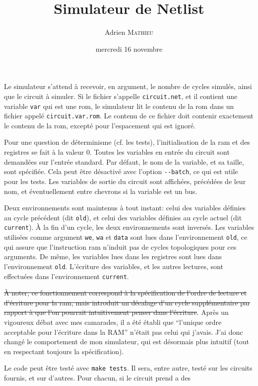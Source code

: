 \documentclass{scrartcl}
\title{Simulateur de Netlist}
\author{Adrien \textsc{Mathieu}}
\date{mercredi 16 novembre}
\begin{document}
\maketitle

Le simulateur s'attend à recevoir, en argument, le nombre de cycles simulés,
ainsi que le circuit à simuler. Si le fichier s'appelle \verb|circuit.net|, et il
contient une variable \verb|var| qui est une rom, le simulateur lit le contenu de
la rom dans un fichier appelé \verb|circuit.var.rom|. Le contenu de ce fichier
doit contenir exactement le contenu de la rom, excepté pour l'espacement qui est
ignoré.\par
Pour une question de déterminisme (cf. les tests), l'initialisation de la ram et
des registres se fait à la valeur $0$. Toutes les variables en entrée du circuit
sont demandées sur l'entrée standard. Par défaut, le nom de la variable, et sa
taille, sont spécifiée. Cela peut être désactivé avec l'option \verb|--batch|,
ce qui est utile pour les tests. Les variables de sortie du circuit sont
affichées, précédées de leur nom, et éventuellement entre chevrons si la variable
est un bus.\par
Deux environnements sont maintenus à tout instant: celui des variables définies
au cycle précédent (dit \verb|old|), et celui des variables définies au cycle
actuel (dit \verb|current|). À la fin d'un cycle, les deux environnements sont
inversés. Les variables utilisées comme argument \verb|we|, \verb|wa| et
\verb|data| sont lues dans l'environnement \verb|old|, ce qui assure que
l'instruction ram n'induit pas de cycles topologiques pour ces arguments. De
même, les variables lues dans les registres sont lues dans l'environnement
\verb|old|. L'écriture des variables, et les autres lectures, sont effectuées
dans l'environnement \verb|current|.\par
\sout{À noter, ce fonctionnement correspond à la spécification de l'ordre de lecture
et d'écriture pour la ram, mais introduit un décalage d'un cycle supplémentaire
par rapport à que l'on pourrait intuitivement penser dans l'écriture}. Après un
vigoureux débat avec mes camarades, il a été établi que ``l'unique ordre acceptable
pour l'écriture dans la RAM'' n'était pas celui qui j'avais. J'ai donc changé
le comportement de mon simulateur, qui est désormais plus intuitif (tout en
respectant toujours la spécification).\par
Le code peut être testé avec \verb|make tests|. Il sera, entre autre, testé sur
les circuits fournis, et sur d'autres. Pour chacun, si le circuit prend a des
\end{document}
